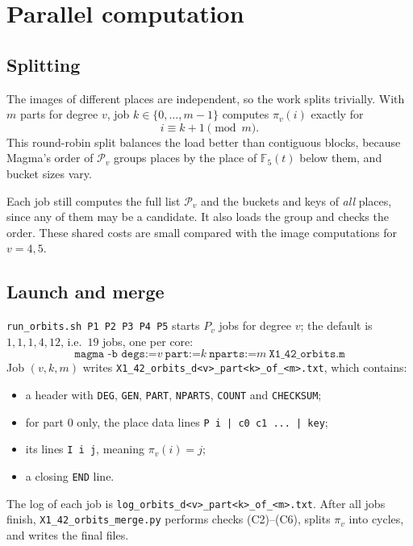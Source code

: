 \documentclass[11pt]{amsart}
\theoremstyle{definition}
\theoremstyle{remark}
\newcommand{\F}{\mathbb{F}}
\newcommand{\Pl}{\mathcal{P}}
\newcommand{\code}[1]{\texttt{#1}}
\begin{document}
\section{Parallel computation}\label{sec:merge}

\subsection{Splitting}
The images of different places are independent, so the work splits trivially. With $m$ parts for degree $v$, job $k\in\{0,\dots,m-1\}$ computes $\pi_v(i)$ exactly for
\[
i\equiv k+1\pmod m.
\]
This round-robin split balances the load better than contiguous blocks, because Magma's order of $\Pl_v$ groups places by the place of $\F_5(t)$ below them, and bucket sizes vary.

Each job still computes the full list $\Pl_v$ and the buckets and keys of \emph{all} places, since any of them may be a candidate. It also loads the group and checks the order. These shared costs are small compared with the image computations for $v=4,5$.

\subsection{Launch and merge}
\code{run\_orbits.sh P1 P2 P3 P4 P5} starts $P_v$ jobs for degree $v$; the default is $1,1,1,4,12$, i.e.\ $19$ jobs, one per core:
\[
\code{magma -b degs:=}v\ \code{part:=}k\ \code{nparts:=}m\ \code{X1\_42\_orbits.m}
\]
Job $(v,k,m)$ writes \code{X1\_42\_orbits\_d<v>\_part<k>\_of\_<m>.txt}, which contains:
\begin{itemize}
\item a header with \code{DEG}, \code{GEN}, \code{PART}, \code{NPARTS}, \code{COUNT} and \code{CHECKSUM};
\item for part $0$ only, the place data lines \code{P i | c0 c1 ... | key};
\item its lines \code{I i j}, meaning $\pi_v(i)=j$;
\item a closing \code{END} line.
\end{itemize}
The log of each job is \code{log\_orbits\_d<v>\_part<k>\_of\_<m>.txt}. After all jobs finish, \code{X1\_42\_orbits\_merge.py} performs checks (C2)--(C6), splits $\pi_v$ into cycles, and writes the final files.

\end{document}
